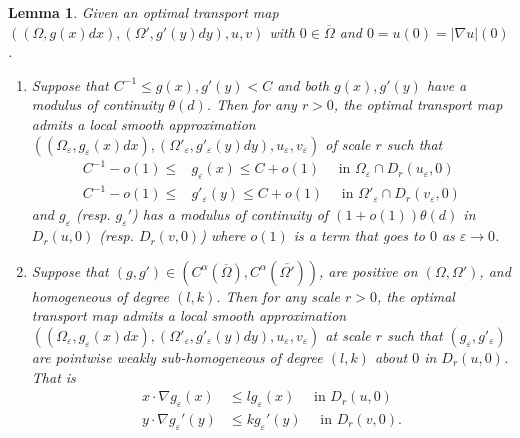 \documentclass[12pt,reqno]{amsart}
\newtheorem{lem}{Lemma}[section]
\newcommand{\eps}{\varepsilon}
\numberwithin{equation}{section}
\begin{document}
    \begin{lem}\label{lem: existApprox}
    Given an optimal transport map $((\Omega, g(x)dx), (\Omega', g'(y)dy), u, v)$ with $0 \in \overline\Omega$ and $0 = u(0) = |\nabla u|(0)$. 
    \begin{enumerate}
        \item Suppose that $C^{-1}\leq g(x), g'(y)<C$
        and both $g(x), g'(y)$ have a modulus of continuity $\theta(d)$. Then for any $r>0$, the optimal transport map admits a local smooth approximation $((\Omega_{\eps}, g_{\eps}(x)dx), (\Omega'_{\eps}, g'_{\eps}(y)dy), u_{\eps},  v_{\eps})$ of scale $r$ such that 
        \[
        \begin{aligned}
            C^{-1}-o(1)\leq &g_{\eps}(x)\leq C+o(1)\quad \text{ in }\Omega_{\eps}\cap D_r(u_{\eps}, 0)\\
            C^{-1}-o(1)\leq &g'_{\eps}(y)\leq C+o(1) \quad \text{ in }\Omega'_{\eps}\cap D_r(v_{\eps}, 0)
            \end{aligned}
            \]
        and $g_{\eps}$ (resp. $g_{\eps}'$) has a modulus of continuity of $(1+o(1))\theta(d)$ in $ D_r(u, 0)$ (resp. $D_r(v, 0)$)  where $o(1)$ is a term that goes to $0$ as $\eps\to 0$. 
        \item  Suppose that $(g, g')\in (C^{\alpha}(\overline{\Omega}), C^{\alpha}(\overline{\Omega'}))$, are positive on $(\Omega, \Omega')$, and homogeneous of degree $(l, k)$. Then for any scale $r>0$, the optimal transport map admits a local smooth approximation $((\Omega_{\eps}, g_{\eps}(x)dx), (\Omega'_{\eps}, g'_{\eps}(y)dy), u_{\eps}, v_{\eps})$ at scale $r$ such that $(g_{\eps}, g'_{\eps})$ are pointwise weakly sub-homogeneous of degree $(l, k)$ about $0$ in $D_r(u, 0)$. That is
        \[
        \begin{aligned}
        x\cdot \nabla g_{\eps}(x)&\leq lg_{\eps}(x) \quad \text{ in } D_r(u, 0)\\
        y\cdot \nabla g_{\eps}'(y)&\leq kg_{\eps}'(y) \quad \text{ in } D_r(v, 0).
        \end{aligned}
        \]
    \end{enumerate}
\end{lem}
\end{document}
